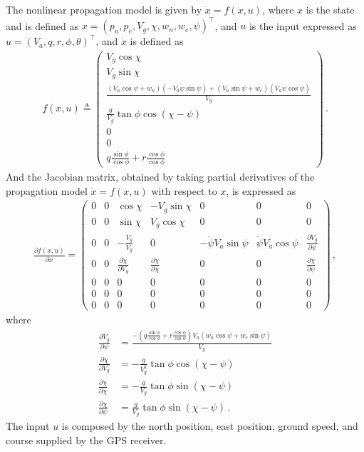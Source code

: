 The nonlinear propagation model is given by $\dot{x}=f(x,u)$, where $x$ is the state and is defined as $x=(p_n,p_e,V_g,\chi,w_n,w_e,\psi)^\top$, and $u$ is the input expressed as $u=(V_a,q,r,\phi,\theta)^\top$, and $\dot{x}$ is defined as
\begin{align}
f(x,u) \triangleq 
\begin{pmatrix}
V_g\cos\chi \\
V_g\sin\chi \\
\frac{(V_a\cos\psi+w_n)(-V_a\dot{\psi}\sin\psi)+(V_a\sin\psi+w_e)(V_a\dot{\psi}\cos\psi)}{V_g} \\
\frac{g}{V_g}\tan\phi\cos(\chi-\psi) \\
0 \\
0 \\
q\frac{\sin\phi}{\cos\phi}+r\frac{\cos\phi}{\cos\phi}
\end{pmatrix}\,.
\end{align}
And the Jacobian matrix, obtained by taking partial derivatives of the propagation model $\dot{x}=f(x,u)$ with respect to $x$, is expressed as
\begin{align}
\frac{\partial f(x,u)}{\partial x}=
\begin{pmatrix}
0 & 0 & \cos\chi & -V_g\sin\chi & 0 & 0 & 0 \\
0 & 0 & \sin\chi & V_g\cos\chi  & 0 & 0 & 0 \\
0 & 0 & -\frac{\dot{V}_g}{V_g} & 0 & -\dot{\psi}V_a\sin\psi & \dot{\psi}V_a\cos\psi & \frac{\partial \dot{V}_g}{\partial \psi} \\
0 & 0 & \frac{\partial \dot{\chi}}{\partial V_g} & \frac{\partial \dot{\chi}}{\partial \chi} & 0 & 0 & \frac{\partial \dot{\chi}}{\partial \psi} \\
0 & 0 & 0& 0 & 0 & 0 & 0 \\
0 & 0 & 0& 0 & 0 & 0 & 0 \\
0 & 0 & 0& 0 & 0 & 0 & 0
\end{pmatrix}\,,
\end{align}
where
\begin{align*}
\frac{\partial\dot{V}_g}{\partial\psi}&= \frac{-\left(q\frac{\sin\phi}{\cos\phi}+r\frac{\cos\phi}{\cos\phi}\right)V_a(w_n\cos\psi+w_e\sin\psi)}{V_g} \\
\frac{\partial\dot{\chi}}{\partial V_g}&= -\frac{g}{V_g^2}\tan\phi\cos(\chi-\psi) \\
\frac{\partial\dot{\chi}}{\partial\chi} &= -\frac{g}{V_g}\tan\phi\sin(\chi-\psi) \\
\frac{\partial\chi}{\partial\psi} &= \frac{g}{V_g}\tan\phi\sin(\chi-\psi)\,.
\end{align*}
The input $u$ is composed by the north position, east position, ground speed, and course supplied by the GPS receiver. 

